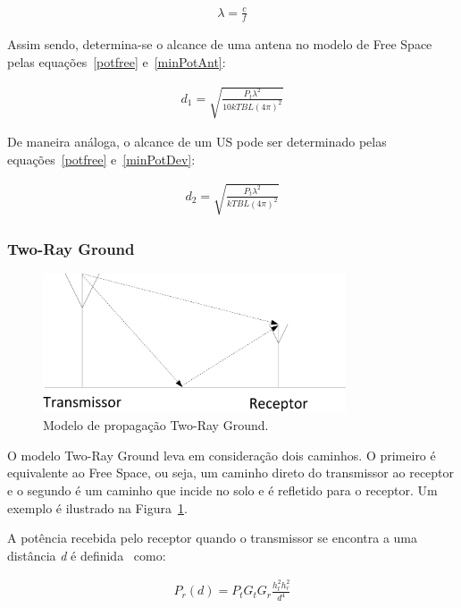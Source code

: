 \begin{align}
  \label{lambda}\lambda=\frac{c}{f}
\end{align}

Assim sendo, determina-se o alcance de uma antena no modelo de Free Space pelas equações~\ref{potfree} e~\ref{minPotAnt}:

\begin{align}
  \label{dFreeAnt} d_1 = \sqrt{\frac{P_t\lambda^{2}}{10kTBL(4\pi)^{2}}}
\end{align}

De maneira análoga, o alcance de um US pode ser determinado pelas equações~\ref{potfree} e~\ref{minPotDev}:

\begin{align}
  \label{dFreeDev} d_2 = \sqrt{\frac{P_t\lambda^{2}}{kTBL(4\pi)^{2}}}
\end{align}

\subsubsection{Two-Ray Ground}

\begin{figure}[htb]
\centering
\includegraphics[width=0.8\textwidth]{figs/tworay}
\caption[Modelo de propagação Two-Ray Ground.]
{Modelo de propagação Two-Ray Ground.}
\label{fig:tworay}
\end{figure}

O modelo Two-Ray Ground leva em consideração dois caminhos. O primeiro é equivalente ao Free Space, ou seja, um caminho direto do transmissor ao receptor e o segundo é um caminho que incide no solo e é refletido para o receptor. Um exemplo é ilustrado na Figura~\ref{fig:tworay}.

A potência recebida pelo receptor quando o transmissor se encontra a uma distância \textit{d} é definida~\cite{rapapport} como: 

\begin{align}
  \label{pottworay} P_r(d) = P_tG_tG_r\frac{h_t^{2}h_r^{2}}{d^4}
\end{align}

